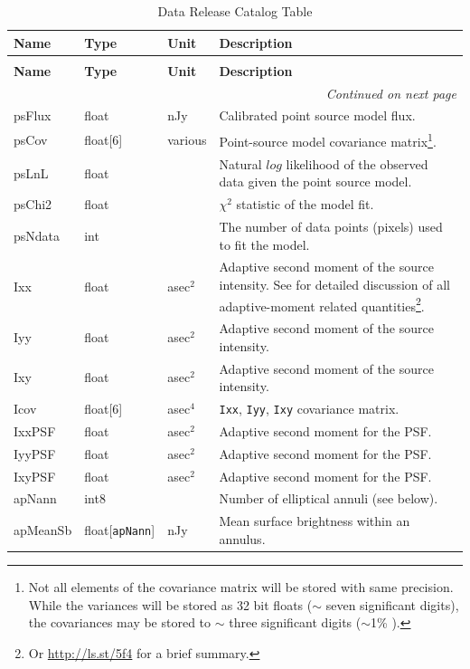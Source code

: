 \documentclass[SE,lsstdraft,toc]{lsstdoc}
\newenvironment{schema}[3]{%
\setlength\LTleft{0pt}
\setlength\LTright{\fill}
\begin{longtable}{p{0.2\textwidth}p{0.14\textwidth}p{0.14\textwidth}p{0.41\textwidth}}

\caption[#1]{#2\label{#3}}\\

\hline \textbf{Name} & \textbf{Type} & \textbf{Unit} & \textbf{Description}\\ \hline
\endfirsthead

\caption[#1]{#2}\\

\hline \textbf{Name} & \textbf{Type} & \textbf{Unit} & \textbf{Description}\\ \hline
\endhead

\hline \multicolumn{4}{r}{\emph{Continued on next page}} \\
\endfoot

\hline\hline
\endlastfoot
}{%
\hline
\end{longtable}
}
\begin{document}
\begin{schema}{\Source Table}{Data Release Catalog \Source Table}{tbl:sourceTable}
psFlux & float & nJy & Calibrated point source model flux.\\

psCov & float[6] & various & Point-source model covariance matrix\footnote{Not all elements of the covariance matrix will be stored with same precision. While the variances will be stored as 32 bit floats ($\sim$ seven significant digits), the covariances may be stored to $\sim$ three significant digits ($\sim$1\% ).}. \\

psLnL & float & ~ & Natural $log$ likelihood of the observed data given the point source model. \\

psChi2 & float & ~ & $\chi^2$ statistic of the model fit. \\

psNdata & int & ~ & The number of data points (pixels) used to fit the model. \\

Ixx & float & asec$^{2}$ & Adaptive second moment of the source intensity. See \citet{2002AJ....123..583B} for detailed discussion of all adaptive-moment related quantities\footnote{Or \url{http://ls.st/5f4} for a brief summary.}. \\

Iyy & float & asec$^{2}$ & Adaptive second moment of the source intensity. \\

Ixy & float & asec$^{2}$ & Adaptive second moment of the source intensity. \\

Icov & float[6] & asec$^{4}$ & \texttt{Ixx}, \texttt{Iyy}, \texttt{Ixy} covariance matrix. \\

IxxPSF & float & asec$^{2}$ & Adaptive second moment for the PSF. \\

IyyPSF & float & asec$^{2}$ & Adaptive second moment for the PSF. \\

IxyPSF & float & asec$^{2}$ & Adaptive second moment for the PSF. \\

apNann & int8 & ~ & Number of elliptical annuli (see below). \\

apMeanSb & float[\texttt{apNann}] & nJy & Mean surface brightness within an annulus. \\


\end{schema}
\end{document}
